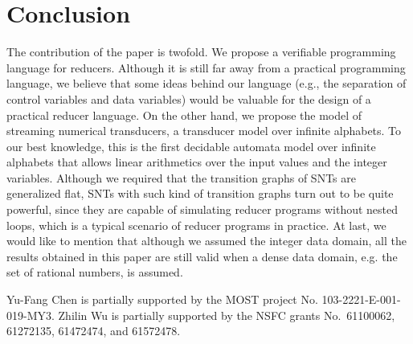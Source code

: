 	
\section{Conclusion}
\label{sec:conclusion}


The contribution of the paper is twofold. We propose a verifiable programming language for reducers. Although it is still far away from a practical programming language, we believe that some ideas behind our language (e.g., the separation of control variables and data variables) would be valuable for the design of a practical reducer language. On the other hand, we propose the model of streaming numerical transducers, a transducer model over infinite alphabets. To our best knowledge, this is the first decidable automata model over infinite alphabets that allows linear arithmetics over the input values and the integer variables. Although we required that the transition graphs of SNTs are generalized flat,  SNTs with such kind of transition graphs turn out to be quite powerful, since they are capable of simulating reducer programs without nested loops, which is a typical scenario of reducer programs in practice. At last, we would like to mention that although we assumed the integer data domain, all the results obtained in this paper are still valid when a dense data domain, e.g. the set of rational numbers, is assumed.

\medskip

 Yu-Fang Chen is partially supported by the MOST project No. 103-2221-E-001-019-MY3. Zhilin Wu is partially supported by the NSFC grants No.\ 61100062, 61272135, 61472474, and 61572478.


